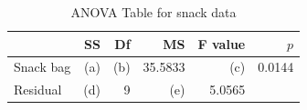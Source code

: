 \begin{table}[ht]
	\centering
	\caption{ANOVA Table for snack data}
	\begin{tabular}{lrrrrr}
		\hline
		          & SS  & Df  & MS      & F value & $p$    \\
		\hline
		Snack bag & (a) & (b) & 35.5833 & (c)     & 0.0144 \\
		Residual  & (d) & 9   & (e)     & 5.0565  &        \\
		\hline
	\end{tabular}
	\label{Example1Ans}
\end{table}

